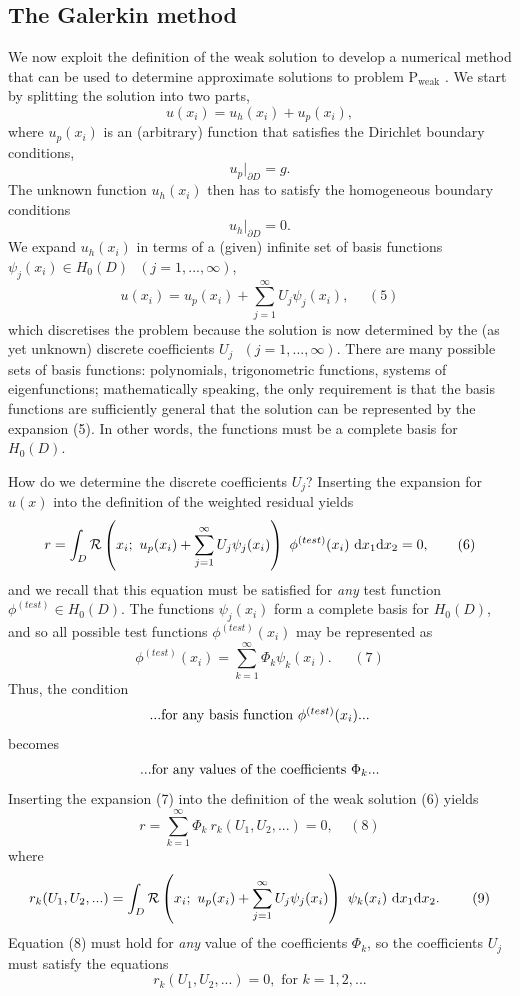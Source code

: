 \hypertarget{index_galerkin}{}\subsection{The Galerkin method}\label{index_galerkin}
We now exploit the definition of the weak solution to develop a numerical method that can be used to determine approximate solutions to problem P$_{\mbox{weak}}$ . We start by splitting the solution into two parts, \[ u(x_i) = u_{h}(x_i) + u_{p}(x_i), \] where $ u_{p}(x_i)$ is an (arbitrary) function that satisfies the Dirichlet boundary conditions, \[ u_{p}|_{\partial D} = g. \] The unknown function $ u_{h}(x_i) $ then has to satisfy the homogeneous boundary conditions \[ u_{h}|_{\partial D} = 0.\] We expand $ u_{h}(x_i) $ in terms of a (given) infinite set of basis functions $ \psi_j(x_i) \in H_0(D) \ \ \ (j=1,...,\infty) $, \[ u(x_i) = u_{p}(x_i) + \sum_{j=1}^{\infty} U_j \psi_j(x_i), \ \ \ \ \ \ (5) \] which discretises the problem because the solution is now determined by the (as yet unknown) discrete coefficients $ U_j \ \ \ (j=1,...,\infty). $ There are many possible sets of basis functions\-: polynomials, trigonometric functions, systems of eigenfunctions; mathematically speaking, the only requirement is that the basis functions are sufficiently general that the solution can be represented by the expansion (5). In other words, the functions must be a complete basis for $H_0(D)$.

How do we determine the discrete coefficients $ U_j $? Inserting the expansion for $u(x)$ into the definition of the weighted residual yields \[ r = \int_{D} {\cal R}\left(x_i; \ u_{p}(x_i)+\sum_{j=1}^{\infty} U_j \psi_j(x_i)\right) \ \phi^{(test)}(x_i) \ \mbox{d}x_1 \mbox{d}x_2 = 0, \ \ \ \ \ \ (6) \] and we recall that this equation must be satisfied for {\itshape any} test function $ \phi^{(test)} \in H_0(D) $. The functions $\psi_j(x_i)$ form a complete basis for $ H_0(D)$, and so all possible test functions $ \phi^{(test)}(x_i) $ may be represented as \[ \phi^{(test)}(x_i) = \sum_{k=1}^{\infty} \Phi_k \psi_k(x_i). \ \ \ \ \ \ \ (7) \] Thus, the condition \[ \mbox{...for any basis function $ \phi^{(test)}(x_i) $...} \] becomes \[ \mbox{...for any values of the coefficients $ \Phi_k$...} \] Inserting the expansion (7) into the definition of the weak solution (6) yields \[ r = \sum_{k=1}^{\infty} \Phi_k \ r_k(U_1, U_2,...) = 0, \ \ \ \ \ (8) \] where \[ r_k(U_1, U_2,...) = \int_{D} {\cal R}\left(x_i; \ u_{p}(x_i)+\sum_{j=1}^{\infty} U_j \psi_j(x_i)\right) \ \psi_k(x_i) \ \mbox{d}x_1 \mbox{d}x_2. \ \ \ \ \ \ \ (9) \] Equation (8) must hold for {\itshape any} value of the coefficients $ \Phi_k $, so the coefficients $ U_j $ must satisfy the equations \[ r_k(U_1, U_2,...) = 0, \mbox{ \ \ \ \ for } k=1,2,... \]

